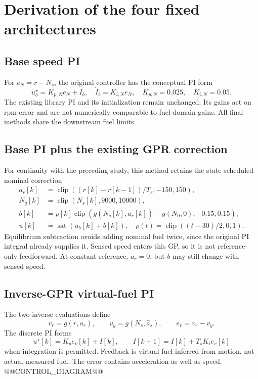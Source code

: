 \section{Derivation of the four fixed architectures}
\subsection{Base speed PI}
For $e_N=r-N_s$, the original controller has the conceptual PI form
\begin{equation}
u_b^\star=K_{p,N}e_N+I_b,\quad \dot I_b=K_{i,N}e_N,\quad K_{p,N}=0.025,\quad K_{i,N}=0.05.
\end{equation}
The existing library PI and its initialization remain unchanged. Its gains act on rpm error and are not numerically comparable to fuel-domain gains. All final methods share the downstream fuel limits.

\subsection{Base PI plus the existing GPR correction}
For continuity with the preceding study, this method retains the state-scheduled nominal correction
\begin{align}
a_r[k]&=\operatorname{clip}((r[k]-r[k-1])/T_s,-150,150),\\
N_q[k]&=\operatorname{clip}(N_s[k],9000,10000),\\
b[k]&=\rho[k]\operatorname{clip}(g(N_q[k],a_r[k])-g(N_0,0),-0.15,0.15),\\
u[k]&=\operatorname{sat}(u_b[k]+b[k]),\quad \rho(t)=\operatorname{clip}((t-30)/2,0,1).
\label{eq:baseff}
\end{align}
Equilibrium subtraction avoids adding nominal fuel twice, since the original PI integral already supplies it. Sensed speed enters this GP, so it is not reference-only feedforward. At constant reference, $a_r=0$, but $b$ may still change with sensed speed.

\subsection{Inverse-GPR virtual-fuel PI}
The two inverse evaluations define
\begin{equation}
v_r=g(r,a_r),\qquad v_y=g(N_s,\hat a_s),\qquad e_v=v_r-v_y.
\label{eq:virtual}
\end{equation}
The discrete PI forms
\begin{equation}
u^\star[k]=K_pe_v[k]+I[k],\qquad I[k+1]=I[k]+T_sK_ie_v[k]
\label{eq:invpi}
\end{equation}
when integration is permitted. Feedback is virtual fuel inferred from motion, not actual measured fuel. The error contains acceleration as well as speed.
@@CONTROL_DIAGRAM@@

